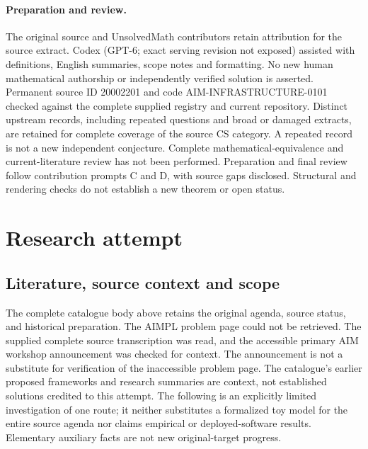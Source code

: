 \documentclass[11pt]{article}
\begin{document}
\paragraph{Preparation and review.}
The original source and UnsolvedMath contributors retain attribution for the source extract. Codex (GPT-6; exact serving revision not exposed) assisted with definitions, English summaries, scope notes and formatting. No new human mathematical authorship or independently verified solution is asserted. Permanent source ID 20002201 and code AIM-INFRASTRUCTURE-0101 checked against the complete supplied registry and current repository. Distinct upstream records, including repeated questions and broad or damaged extracts, are retained for complete coverage of the source CS category. A repeated record is not a new independent conjecture. Complete mathematical-equivalence and current-literature review has not been performed. Preparation and final review follow contribution prompts C and D, with source gaps disclosed. Structural and rendering checks do not establish a new theorem or open status.
\label{end:20002201}

\section{Research attempt}
\subsection{Literature, source context and scope}
The complete catalogue body above retains the original agenda, source status, and historical preparation. The AIMPL problem page could not be retrieved. The supplied complete source transcription was read, and the accessible primary AIM workshop announcement was checked for context. The announcement is not a substitute for verification of the inaccessible problem page. The catalogue's earlier proposed frameworks and research summaries are context, not established solutions credited to this attempt. The following is an explicitly limited investigation of one route; it neither substitutes a formalized toy model for the entire source agenda nor claims empirical or deployed-software results. Elementary auxiliary facts are not new original-target progress.
\end{document}
